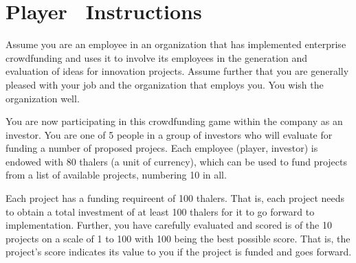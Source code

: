 \documentclass[11pt, oneside]{article}   	%
\begin{document}

	
\ifnum{}


\section{Player \theplayer\ Instructions}

Assume you are an employee in an organization that has implemented enterprise crowdfunding and uses it to involve its employees in the generation and evaluation of ideas for innovation projects. Assume further that you are generally pleased with your job and the organization that employs you. You wish the organization well.

You are now participating in this crowdfunding game within the company as an investor. You are one of 5 people in a group of investors who will evaluate for funding a number of proposed projecs. Each employee (player, investor) is endowed with 80 thalers (a unit of currency), which can be used to fund projects from a list of available projects, numbering 10 in all.

Each project has  a funding requireent of 100 thalers. That is, each project needs to obtain a total   investment of at least 100 thalers for it to go forward to implementation. Further, you have carefully evaluated and scored is of the 10 projects on a scale of 1 to 100 with 100 being the best possible score. That is, the project's score indicates its value to you if the project is funded and goes forward.
\end{document}
